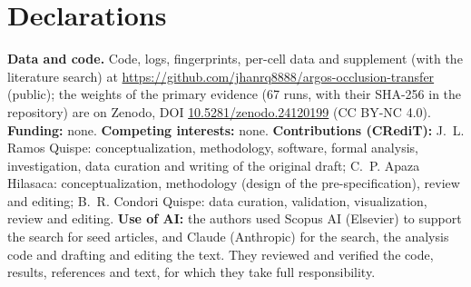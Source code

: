 \documentclass[conference]{IEEEtran}
\begin{document}
\section*{Declarations}
\textbf{Data and code.} Code, logs, fingerprints, per-cell data and supplement (with the literature search) at \url{https://github.com/jhanrq8888/argos-occlusion-transfer} (public); the weights of the primary evidence (67 runs, with their SHA-256 in the repository) are on Zenodo, DOI \href{https://doi.org/10.5281/zenodo.24120199}{\mbox{10.5281/zenodo.24120199}} (CC BY-NC 4.0). \textbf{Funding:} none. \textbf{Competing interests:} none. \textbf{Contributions (CRediT):} J.~L. Ramos Quispe: conceptualization, methodology, software, formal analysis, investigation, data curation and writing of the original draft; C.~P. Apaza Hilasaca: conceptualization, methodology (design of the pre-specification), review and editing; B.~R. Condori Quispe: data curation, validation, visualization, review and editing. \textbf{Use of AI:} the authors used Scopus AI (Elsevier) to support the search for seed articles, and Claude (Anthropic) for the search, the analysis code and drafting and editing the text. They reviewed and verified the code, results, references and text, for which they take full responsibility.



\end{document}
